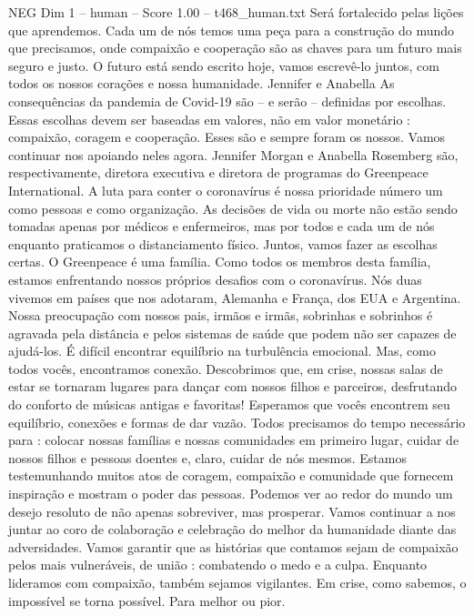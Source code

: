 \begin{textsample}{NEG Dim 1 – human – Score 1.00 – t468\_human.txt}
Será fortalecido pelas lições que aprendemos.
Cada um de nós temos uma peça para a construção do mundo que precisamos, onde compaixão e cooperação são as chaves para um futuro mais seguro e justo.
O futuro está sendo escrito hoje, vamos escrevê-lo juntos, com todos os nossos corações e nossa humanidade.
Jennifer e Anabella As consequências da pandemia de Covid-19 são – e serão – definidas por escolhas.
Essas escolhas devem ser baseadas em valores, não em valor monetário : compaixão, coragem e cooperação.
Esses são e sempre foram os nossos.
Vamos continuar nos apoiando neles agora.
Jennifer Morgan e Anabella Rosemberg são, respectivamente, diretora executiva e diretora de programas do Greenpeace International.
A luta para conter o coronavírus é nossa prioridade número um como pessoas e como organização.
As decisões de vida ou morte não estão sendo tomadas apenas por médicos e enfermeiros, mas por todos e cada um de nós enquanto praticamos o distanciamento físico.
Juntos, vamos fazer as escolhas certas.
O Greenpeace é uma família.
Como todos os membros desta família, estamos enfrentando nossos próprios desafios com o coronavírus.
Nós duas vivemos em países que nos adotaram, Alemanha e França, dos EUA e Argentina.
Nossa preocupação com nossos pais, irmãos e irmãs, sobrinhas e sobrinhos é agravada pela distância e pelos sistemas de saúde que podem não ser capazes de ajudá-los. É difícil encontrar equilíbrio na turbulência emocional.
Mas, como todos vocês, encontramos conexão.
Descobrimos que, em crise, nossas salas de estar se tornaram lugares para dançar com nossos filhos e parceiros, desfrutando do conforto de músicas antigas e favoritas!
Esperamos que vocês encontrem seu equilíbrio, conexões e formas de dar vazão.
Todos precisamos do tempo necessário para : colocar nossas famílias e nossas comunidades em primeiro lugar, cuidar de nossos filhos e pessoas doentes e, claro, cuidar de nós mesmos.
Estamos testemunhando muitos atos de coragem, compaixão e comunidade que fornecem inspiração e mostram o poder das pessoas.
Podemos ver ao redor do mundo um desejo resoluto de não apenas sobreviver, mas prosperar.
Vamos continuar a nos juntar ao coro de colaboração e celebração do melhor da humanidade diante das adversidades.
Vamos garantir que as histórias que contamos sejam de compaixão pelos mais vulneráveis, de união : combatendo o medo e a culpa.
Enquanto lideramos com compaixão, também sejamos vigilantes.
Em crise, como sabemos, o impossível se torna possível.
Para melhor ou pior.

\end{textsample}
